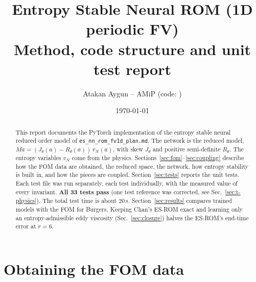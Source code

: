 \documentclass[11pt,a4paper]{article}
\title{Entropy Stable Neural ROM (1D periodic FV)\\[2pt]
\large Method, code structure and unit test report}
\author{Atakan Aygun -- AMiP \quad (code: \code{ES-ROM/ROM/})}
\date{\today}
\newcommand{\code}[1]{\texttt{\small #1}}
\begin{document}
\maketitle

\begin{abstract}
This report documents the PyTorch implementation of the entropy stable neural reduced order model of \code{es\_nn\_rom\_fv1d\_plan.md}. The network is the reduced model, $M\dot a=(J_\theta(a)-R_\theta(a))\,v_N(a)$, with skew $J_\theta$ and positive semi-definite $R_\theta$. The entropy variables $v_N$ come from the physics. Sections~\ref{sec:fom}--\ref{sec:coupling} describe how the FOM data are obtained, the reduced space, the network, how entropy stability is built in, and how the pieces are coupled. Section~\ref{sec:tests} reports the unit tests. Each test file was run separately, each test individually, with the measured value of every invariant. \textbf{All 33 tests pass} (one test reference was corrected, see Sec.~\ref{sec:t-physics}). The total test time is about 20\,s. Section~\ref{sec:results} compares trained models with the FOM for Burgers. Keeping Chan's ES-ROM exact and learning only an entropy-admissible eddy viscosity (Sec.~\ref{sec:closure}) halves the ES-ROM's end-time error at $r=6$.
\end{abstract}

\tableofcontents

\section{Obtaining the FOM data}\label{sec:fom}
\end{document}
